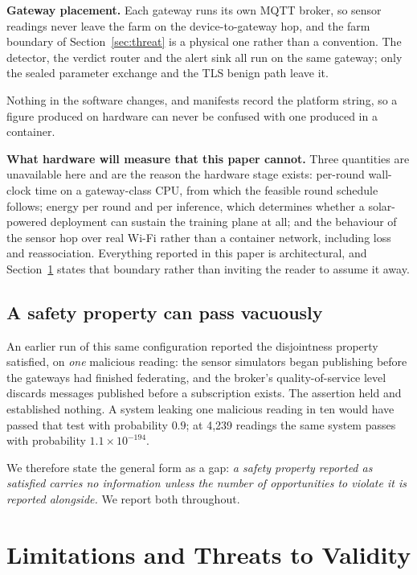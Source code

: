 \documentclass[conference]{IEEEtran}
\begin{document}
\textbf{Gateway placement.} Each gateway runs its own MQTT broker, so sensor readings never leave
the farm on the device-to-gateway hop, and the farm boundary of
Section~\ref{sec:threat} is a physical one rather than a convention. The detector, the verdict
router and the alert sink all run on the same gateway; only the sealed parameter exchange and the
TLS benign path leave it.

Nothing in the software changes, and manifests record the platform string, so a figure
produced on hardware can never be confused with one produced in a container.

\textbf{What hardware will measure that this paper cannot.} Three quantities are unavailable
here and are the reason the hardware stage exists: per-round wall-clock time on a gateway-class
CPU, from which the feasible round schedule follows; energy per round and per inference, which
determines whether a solar-powered deployment can sustain the training plane at all; and the
behaviour of the sensor hop over real Wi-Fi rather than a container network, including loss and
reassociation. Everything reported in this paper is architectural, and
Section~\ref{sec:limitations} states that boundary rather than inviting the reader to assume it
away.

\subsection{A safety property can pass vacuously}\label{sec:vacuous}
An earlier run of this same configuration reported the disjointness property satisfied, on
\emph{one} malicious reading: the sensor simulators began publishing before the gateways had
finished federating, and the broker's quality-of-service level discards messages published before
a subscription exists. The assertion held and established nothing. A system leaking one malicious
reading in ten would have passed that test with probability $0.9$; at 4{,}239 readings the same
system passes with probability $1.1\times10^{-194}$.

We therefore state the general form as a gap: \emph{a safety property reported as satisfied
carries no information unless the number of opportunities to violate it is reported alongside.}
We report both throughout.

\section{Limitations and Threats to Validity}\label{sec:limitations}
\end{document}

